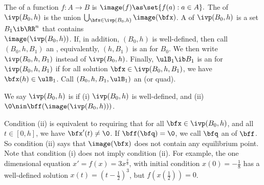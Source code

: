	The  of a function $f: A \to B$ is
		$\image(f) \as \set{f(a) : a \in A}.$  
	The  of $\ivp(B_0, h)$ is the union
		$\bigcup_{\bfx \in \ivp(B_0, h)} \image(\bfx)$.
	A  of $\ivp(B_0, h)$ is a
	set $B_1\ib\RR^n$ that contains\\
		$\image(\ivp(B_0, h))$.
	If, in addition, $(B_0,h)$ is well-defined,
	then call $(B_0,h,B_1)$ an ,
	equivalently, $(h,B_1)$ is an  for $B_0$.
	We then write $\ivp(B_0,h,B_1)$ instead of $\ivp(B_0,h)$.
	Finally, $\ulB_1\ib B_1$ is
	an  for $\ivp(B_0, h, B_1)$
	if for all solution $\bfx \in \ivp(B_0, h, B_1)$, 
	we have $\bfx(h) \in \ulB_1$.  Call $(B_0,h,B_1,\ulB_1)$
	an  (or quad).


	 We say 
	  $\ivp(B_0, h)$ is  if
	  (i) $\ivp(B_0,h)$ is well-defined, and
	  (ii) $\0 \nin \bff(\image(\ivp(B_0,h)))$.

	  
	Condition (ii) is equivalent to requiring that
	for all $\bfx\in \ivp(B_0,h)$, and all $t \in [0, h]$,  
	we have $\bfx'(t) \neq \0$.
	If $\bff(\bfq)=\0$, we call $\bfq$
	an  of $\bff$.  So condition (ii)
	says that $\image(\bfx)$ does not contain any equilibrium
	point.
	Note that condition (i) does not imply condition
	(ii). For example, the one dimensional equation  
	  $x' = f(x) = 3x^{\frac{2}{3}}$,  
	  with initial condition $x(0) = -\frac{1}{8}$ has a
	  well-defined solution $x(t) = (t - \frac{1}{2})^3$, 
	  but $f(x(\frac{1}{2})) = 0$.  



